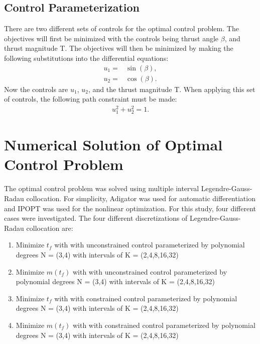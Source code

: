 \documentclass[]{article}
\begin{document}
	\subsection{Control Parameterization}
	There are two different sets of controls for the optimal control problem. The objectives will first be minimized with the controls being thrust angle \(\beta\), and thrust magnitude T. The objectives will then be minimized by making the following substitutions into the differential equations:
	\begin{align*}                                                                                                                                                                        
    	u_1 =& \sin(\beta), \\
    	u_2 =& \cos(\beta).
	\end{align*}
	Now the controls are \(u_1\), \(u_2\), and the thrust magnitude T. When applying this set of controls, the following path constraint must be made:
	\begin{align*}                                                                                                                                                                        
		u_1^2 + u_2^2 = 1.
	\end{align*}
	
	\section{Numerical Solution of Optimal Control Problem}
	The optimal control problem was solved using multiple interval Legendre-Gauss-Radau collocation. For simplicity, Adigator was used for automatic differentiation and IPOPT was used for the nonlinear optimization. For this study, four different cases were investigated. The four different discretizations of Legendre-Gauss-Radau collocation are:
	\begin{enumerate}
		\item Minimize \(t_f\) with with unconstrained control parameterized by polynomial degrees N = (3,4) with intervals of K = (2,4,8,16,32)
		\item Minimize \(m(t_f)\) with with unconstrained control parameterized by polynomial degrees N = (3,4) with intervals of K = (2,4,8,16,32)
		\item Minimize \(t_f\) with with constrained control parameterized by polynomial degrees N = (3,4) with intervals of K = (2,4,8,16,32)
		\item Minimize \(m(t_f)\) with with constrained control parameterized by polynomial degrees N = (3,4) with intervals of K = (2,4,8,16,32)
	\end{enumerate}
%     
\end{document}
